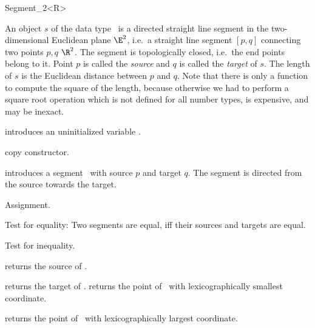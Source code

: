 \begin{ccRefClass} {Segment_2<R>}


\ccDefinition  An object $s$ of the data type \ccRefName\ is a directed
straight line segment in the two-dimensional Euclidean plane $\E^2$, i.e.\ a
straight line segment $[p,q]$ connecting two points $p,q$ 
$\R^2$. The segment is topologically closed, i.e.\  the end
points belong to it. Point $p$ is called the {\em source} and $q$
is called the {\em target} of $s$. The length of $s$ is the
Euclidean distance between $p$ and $q$. Note that there is only a function
to compute the square of the length, because otherwise we had to
perform a square root operation which is not defined for all
number types, is expensive, and may be inexact.

\ccCreation
{}


\ccHidden {}
             {introduces an uninitialized variable \ccVar.}

\ccHidden {}
 	    {copy constructor.}

            {introduces a segment \ccVar\ with source $p$
             and target $q$. The segment is directed from the source towards
             the target.}


\ccOperations

\ccHidden {}
        {Assignment.}

       {Test for equality: Two segments are equal, iff their sources and
        targets are equal.}

       {Test for inequality.}


       {returns the source of \ccVar.}

       {returns the target of \ccVar.}
\ccGlue
{}
       {returns the point of \ccVar\ with lexicographically smallest coordinate.}

       {returns the point of \ccVar\ with lexicographically largest coordinate.}



\end{ccRefClass}
